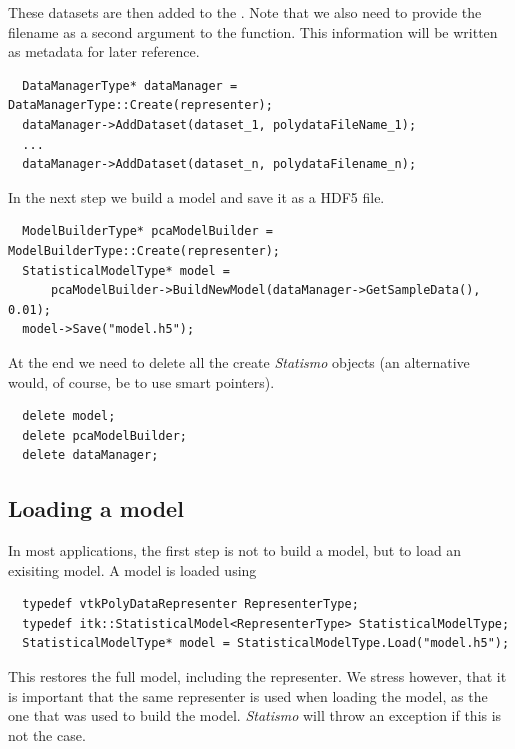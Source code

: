 \documentclass{InsightArticle}
\newcommand{\Statismo}{\emph{Statismo}\xspace}
\begin{document}
These datasets are then added to the . Note that we also need to provide the filename as
a second argument to the  function. This information will be written as metadata for later
reference. 

\begin{verbatim}
  DataManagerType* dataManager =  DataManagerType::Create(representer);
  dataManager->AddDataset(dataset_1, polydataFileName_1);
  ...
  dataManager->AddDataset(dataset_n, polydataFilename_n);
\end{verbatim}
In the next step we build a model and save it as a HDF5 file. 
\begin{verbatim}
  ModelBuilderType* pcaModelBuilder = ModelBuilderType::Create(representer);
  StatisticalModelType* model =  
      pcaModelBuilder->BuildNewModel(dataManager->GetSampleData(), 0.01);
  model->Save("model.h5");
\end{verbatim}
At the end we need to delete all the create \Statismo objects (an alternative would, of course, be to use
smart pointers).
\begin{verbatim}
  delete model;
  delete pcaModelBuilder;
  delete dataManager;
\end{verbatim}

\subsection{Loading a model}
In most applications, the first step is not to build a model, but to load an exisiting model. 
A model is loaded using 
\begin{verbatim}
  typedef vtkPolyDataRepresenter RepresenterType;
  typedef itk::StatisticalModel<RepresenterType> StatisticalModelType;
  StatisticalModelType* model = StatisticalModelType.Load("model.h5");
\end{verbatim}
This restores the full model, including the representer. 
We stress however, that it is important that the same representer is used when loading the model, as the one that was used to build the model. 
\Statismo will throw an exception if this is not the case. 
\end{document}
